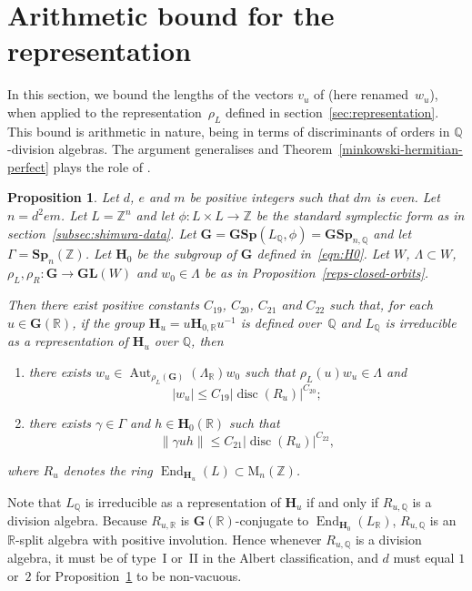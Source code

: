 \documentclass[11pt]{article}
\numberwithin{equation}{section}
\newenvironment{enumeratea}
{\bgroup\def\theenumi{\alph{enumi}}\begin{enumerate}}
{\end{enumerate}\egroup}
\newcommand{\bQ}{\mathbb{Q}}
\newcommand{\bR}{\mathbb{R}}
\newcommand{\bZ}{\mathbb{Z}}
\newcommand{\gG}{\mathbf{G}}
\newcommand{\gGL}{\mathbf{GL}}
\newcommand{\gGSp}{\mathbf{GSp}}
\newcommand{\gH}{\mathbf{H}}
\newcommand{\gSp}{\mathbf{Sp}}
\newcommand{\rM}{\mathrm{M}}
\DeclareMathOperator{\Aut}{Aut}
\DeclareMathOperator{\disc}{disc}
\DeclareMathOperator{\End}{End}
\newcommand{\abs}[1]{\lvert #1 \rvert}
\newcommand{\length}[1]{\lVert #1 \rVert}
\newtheorem{proposition}[lemma]{Proposition}
\begin{document}
\section{Arithmetic bound for the representation} \label{sec:rep-bound}

In this section, we bound the lengths of the vectors $v_u$ of \cite[Th.\,1.2]{QRTUI} (here renamed~$w_u$), when applied to the representation~$\rho_L$ defined in section~\ref{sec:representation}. This bound is arithmetic in nature, being in terms of discriminants of orders in $\bQ$-division algebras. The argument generalises \cite[\S 5.5]{QRTUI} and Theorem~\ref{minkowski-hermitian-perfect} plays the role of \cite[Lem.\,5.7]{QRTUI}.

\begin{proposition} \label{rep-bound-arithmetic}
Let $d$, $e$ and $m$ be positive integers such that $dm$ is even.
Let $n = d^2em$.
Let $L = \bZ^n$ and let $\phi \colon L \times L \to \bZ$ be the standard symplectic form as in section~\ref{subsec:shimura-data}.
Let $\gG = \gGSp(L_\bQ, \phi) = \gGSp_{n,\bQ}$ and let $\Gamma = \gSp_n(\bZ)$.
Let $\gH_0$ be the subgroup of $\gG$ defined in~\eqref{eqn:H0}.
Let $W$, $\Lambda \subset W$, $\rho_L, \rho_R \colon \gG \to \gGL(W)$ and $w_0 \in \Lambda$ be as in Proposition~\ref{reps-closed-orbits}.

Then there exist positive constants $C_{19}$, $C_{20}$, $C_{21}$ and $C_{22}$ such that,
for each $u \in \gG(\bR)$, if the group $\gH_u = u \gH_{0,\bR} u^{-1}$ is defined over~$\bQ$ and $L_\bQ$ is irreducible as a representation of $\gH_u$ over $\bQ$, then
\begin{enumeratea}
\item\label{rep-bound-arithmetica} there exists $w_u \in \Aut_{\rho_L(\gG)}(\Lambda_\bR) w_0$ such that $\rho_L(u) w_u \in \Lambda$ and
\[
\abs{w_u} \leq C_{19} \abs{\disc(R_u)}^{C_{20}};
\]
\item\label{rep-bound-arithmeticb} there exists $\gamma \in \Gamma$ and $h \in \gH_0(\bR)$ such that
\[
\length{\gamma uh} \leq C_{21} \abs{\disc(R_u)}^{C_{22}},
\]
\end{enumeratea}
where $R_u$ denotes the ring $\End_{\gH_u}(L) \subset \rM_n(\bZ)$.
\end{proposition}

Note that $L_\bQ$ is irreducible as a representation of $\gH_u$ if and only if $R_{u,\bQ}$ is a division algebra.
Because $R_{u,\bR}$ is $\gG(\bR)$-conjugate to $\End_{\gH_0}(L_\bR)$, $R_{u,\bQ}$ is an $\bR$-split algebra with positive involution. Hence whenever $R_{u,\bQ}$ is a division algebra, it must be of type~I or~II in the Albert classification, and $d$ must equal $1$ or~$2$ for Proposition~\ref{rep-bound-arithmetic} to be non-vacuous.
\end{document}
